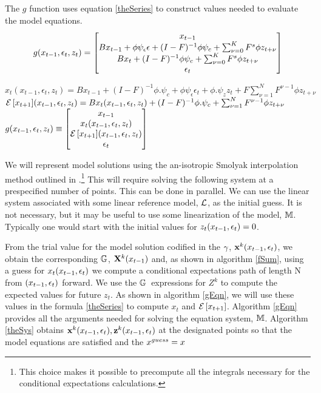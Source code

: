\documentclass[12pt]{article}
\begin{document}
The $g$ function uses equation \ref{theSeries} to construct values needed to evaluate the model equations.
\begin{gather}
  g(x_{t-1},\epsilon_t,z_t)=
  \begin{bmatrix}
    x_{t-1}\\
B x_{t-1}+ \phi \psi_\epsilon\epsilon + (I - F)^{-1} \phi \psi_c + \sum_{{\nu}=0}^K F^s \phi z_{t+{\nu}} \\
B x_{t}+   (I - F)^{-1} \phi \psi_c + \sum_{{\nu}=0}^K F^s \phi z_{t+{\nu}} \\
\epsilon_t
  \end{bmatrix}
\end{gather}
\begin{algorithm}
$x_t(x_{t-1},\epsilon_t,z_t)=B x_{t-1} + (I-F)^{-1} \phi. \psi_c+\phi \psi_\epsilon \epsilon_t + \phi . \psi_z z_t + F\sum_{\nu=1}^N F^{\nu-1} \phi z_{t+\nu} $\;
${\mathcal{E}\left [ x_{t+1} \right ]}(x_{t-1},\epsilon_t,z_t)=B x_{t}(x_{t-1},\epsilon_t,z_t) + (I-F)^{-1} \phi. \psi_c + \sum_{\nu=1}^N F^{\nu-1} \phi z_{t+\nu} $\;
$g(x_{t-1},\epsilon_t,z_t)\equiv
\begin{bmatrix}
  x_{t-1}\\x_t(x_{t-1},\epsilon_t,z_t)\\{\mathcal{E}\left [ x_{t+1} \right ]}(x_{t-1},\epsilon_t,z_t)\\ \epsilon_t
\end{bmatrix}
$\;
\caption{$\modArgs(\linMod,\sum_{\nu=1}^N F^{\nu-1} \phi z_{t+\nu})$}
\label{gEqn}
\end{algorithm}

We will represent model solutions using the an-isotropic Smolyak interpolation method outlined in \cite{Judd2014}.\footnote{ This choice makes it possible to precompute all the integrals necessary for the conditional expectations calculations.}  This will require solving
the following system at a prespecified number of points.  This can be done in parallel. We can use the linear system associated with some 
linear reference model, ${\mathcal{L}}$, as the initial guess.  
It is not necessary, but it may be useful to use some linearization of the model, $\mathbb{M}$.  Typically one would start with the initial values for $z_t(x_{t-1},\epsilon_t)=0$.

From the  trial value for the model solution codified in the ${{\gamma}}$, $\mathbf{x}^k(x_{t-1},\epsilon_t)$, we obtain the corresponding ${\mathbb{G}}$, $\mathbf{X}^k(x_{t-1})$ and, as
 shown in algorithm \ref{fSum}, using
a guess for $x_t(x_{t-1},\epsilon_t)$ we compute a conditional expectations path of length N from $(x_{t-1},\epsilon_t)$ forward.  We use the ${\mathbb{G}}$\ expressions for $Z^k$ to compute the expected values for future $z_t$. As shown in algorithm \ref{gEqn}, we 
will use these values in the formula \ref{theSeries} to compute $x_t$ and ${\mathcal{E}\left [ x_{t+1} \right ]}$. Algorithm \ref{gEqn} provides all the arguments needed for solving the equation system, $\mathbb{M}$.  Algorithm \ref{theSys} obtains  $\mathbf{x}^k(x_{t-1},\epsilon_t),\mathbf{z}^k(x_{t-1},\epsilon_t)$ at the designated points so that the model equations are satisfied and the $x^{guess}_{}=x$
\end{document}
